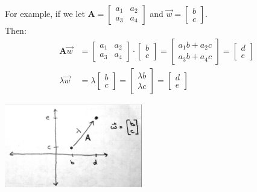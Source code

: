 \documentclass{article}
\begin{document}
For example,  if we let $\mathbf{A}  = \begin{bmatrix} a_1 & a_2 \\ a_3 & a_4 \end{bmatrix}$ and $\vec{w} = \begin{bmatrix}b \\ c \end{bmatrix}$.\\
Then:
\begin{align*}
	\mathbf{A} \vec{w} &= \begin{bmatrix} a_1 & a_2 \\ a_3 & a_4 \end{bmatrix} \cdot \begin{bmatrix} b \\ c\end{bmatrix} = \begin{bmatrix} a_1 b +  a_2 c \\ a_3 b + a_4 c \end{bmatrix} = \begin{bmatrix} d \\ e \end{bmatrix}\\
	\lambda \vec{w} &= \lambda \begin{bmatrix}b \\ c \end{bmatrix}=  \begin{bmatrix}\lambda b \\ \lambda c \end{bmatrix}  = \begin{bmatrix} d \\ e \end{bmatrix}
\end{align*}

\begin{center}
	\includegraphics[width=6cm]{figs/eigen1.pdf}
\end{center}
\end{document}
